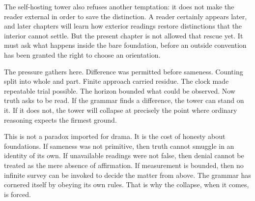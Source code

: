 The self-hosting tower also refuses another temptation: it does not make
the reader external in order to save the distinction. A reader certainly
appears later, and later chapters will learn how exterior readings
restore distinctions that the interior cannot settle. But the present
chapter is not allowed that rescue yet. It must ask what happens inside
the bare foundation, before an outside convention has been granted the
right to choose an orientation.

The pressure gathers here. Difference was permitted before sameness.
Counting split into whole and part. Finite approach carried residue.
The clock made repeatable trial possible. The horizon bounded what could
be observed. Now truth asks to be read. If the grammar finds a
difference, the tower can stand on it. If it does not, the tower will
collapse at precisely the point where ordinary reasoning expects the
firmest ground.

This is not a paradox imported for drama. It is the cost of honesty about
foundations. If sameness was not primitive, then truth cannot smuggle in
an identity of its own. If unavailable readings were not false, then
denial cannot be treated as the mere absence of affirmation. If
measurement is bounded, then no infinite survey can be invoked to decide
the matter from above. The grammar has cornered itself by obeying its
own rules. That is why the collapse, when it comes, is forced.
